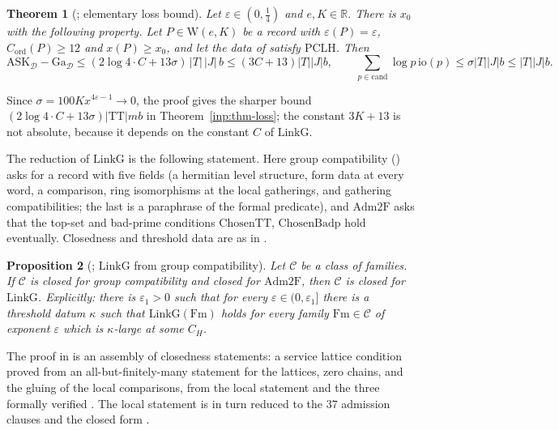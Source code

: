 \documentclass[10pt]{amsart}
\newtheorem{theorem}{Theorem}[section]
\newtheorem{proposition}[theorem]{Proposition}
\theoremstyle{definition}
\theoremstyle{remark}
\newcommand{\R}{\mathbb R}
\begin{document}
\begin{theorem}[{\cite[Theorem~\ref{A-i1:thm-elementary}]{Annex}}; elementary loss bound]\label{inp:thm-elementary}
Let $\varepsilon\in(0,\frac14)$ and $e,K\in\R$. There is $x_0$ with the
following property. Let $P\in\mathrm W(e,K)$ be a record with
$\varepsilon(P)=\varepsilon$, $C_{\mathrm{ord}}(P)\ge12$ and $x(P)\ge x_0$, and
let the data of \cite[Definition~\ref{A-i1:def-PCLH}]{Annex} satisfy $\mathrm{PCLH}$. Then
\[
\mathrm{ASK}_{\mathcal D}-\mathrm{Ga}_{\mathcal D}\le(2\log4\cdot C+13\sigma)\,|T|\,|J|\,b\le(3C+13)|T||J|b,\qquad
\sum_{p\in\mathrm{cand}}\log p\,\mathrm{io}(p)\le\sigma|T||J|b\le|T||J|b .
\]
\end{theorem}

\noindent Since $\sigma=100Kx^{4\varepsilon-1}\to0$, the proof gives the sharper bound
$(2\log4\cdot C+13\sigma)|\mathrm{TT}|mb$ in Theorem~\ref{inp:thm-loss}; the
constant $3K+13$ is not absolute, because it depends on the constant $C$ of
$\mathrm{LinkG}$.

The reduction of $\mathrm{LinkG}$ is the following statement. Here group compatibility
(\cite[Definition~\ref{A-i1:def-groupcompat}]{Annex}) asks for a record with
five fields (a hermitian level structure, form data at every word, a
comparison, ring isomorphisms at the local gatherings, and gathering
compatibilities; the last is a paraphrase of the formal predicate), and
$\mathrm{Adm2F}$ asks that the top-set and bad-prime conditions
$\mathrm{ChosenTT}$, $\mathrm{ChosenBadp}$ hold eventually. Closedness and
threshold data are as in \cite[Definition~\ref{A-i4:def-closed}]{Annex}.

\begin{proposition}[{\cite[Proposition~\ref{A-i1:prop-linkG}]{Annex}}; $\mathrm{LinkG}$ from group compatibility]\label{inp:prop-linkG}
Let $\mathcal C$ be a class of families. If $\mathcal C$ is closed for group
compatibility and closed for $\mathrm{Adm2F}$, then $\mathcal C$ is closed
for $\mathrm{LinkG}$. Explicitly: there is $\varepsilon_1>0$ such that for
every $\varepsilon\in(0,\varepsilon_1]$ there is a threshold datum $\kappa$
such that $\mathrm{LinkG}(\mathrm{Fm})$ holds for every family
$\mathrm{Fm}\in\mathcal C$ of exponent $\varepsilon$ which is $\kappa$-large
at some $C_H$.
\end{proposition}

\noindent The proof in \cite[\S\ref{A-i1:ssec-pf-linkG}]{Annex} is an
assembly of closedness statements: a service lattice condition proved from
an all-but-finitely-many statement for the lattices, zero chains, and the
gluing of the local comparisons, from the local statement
\cite[Proposition~\ref{A-i1:prop-loc}]{Annex} and the three formally verified
\cite[Propositions~\ref{A-i1:prop-first}, \ref{A-i1:prop-gc},
\ref{A-i1:prop-linkG-res}]{Annex}. The local statement is in turn reduced to
the $37$ admission clauses and the closed form
\cite[Proposition~\ref{A-i1:prop-closed}]{Annex}.
\end{document}
